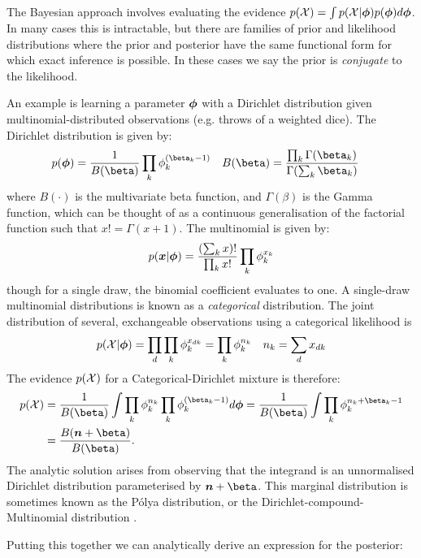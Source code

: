The Bayesian approach involves evaluating the evidence $p({ \mathcal{X} }) = \int p({ \mathcal{X} } | { \bm \phi }) p({ \bm \phi }) d{ \bm \phi }$. In many cases this is intractable, but there are families of prior and likelihood distributions where the prior and posterior have the same functional form for which exact inference is possible. In these cases we say the prior is \emph{conjugate} to the likelihood.

An example is learning a parameter ${ \bm \phi }$ with a Dirichlet distribution given multinomial-distributed observations (e.g. throws of a weighted dice). The Dirichlet distribution is given by:
\begin{align}
p(\param) & = \oneover{B(\vv{\beta})} \prod_k \phi_k^{(\beta_k - 1)} &
B(\vv{\beta}) & = \frac{\prod_k \Gamma(\beta_k)}{\Gamma(\sum_k \beta_k)}
\end{align}
where $B(\cdot)$ is the multivariate beta function, and $\Gamma(\beta)$ is the Gamma function, which can be thought of as a continuous generalisation of the factorial function such that $x! = \Gamma(x+1)$. The multinomial is given by:
\begin{align}
p(\bm x|{ \bm \phi }) = \frac{(\sum_k x)!}{\prod_k x!} \prod_k \phi_k^{x_k}
\end{align}
though for a single draw, the binomial coefficient evaluates to one. A single-draw multinomial distributions is known as a \emph{categorical} distribution. The joint distribution of several, exchangeable observations using a categorical likelihood is 
\begin{align}
p({ \mathcal{X} }|{ \bm \phi }) & = \prod_d \prod_k \phi_k^{x_{dk}} = \prod_k \phi_k^{n_k} &
n_k = \sum_d x_{dk}
\end{align}
The evidence $p({ \mathcal{X} })$ for a Categorical-Dirichlet mixture is therefore:
\begin{align}
p(\xdat) & = \frac{1}{B(\beta)} \int \prod_k \phi_k^{n_k} \prod_k \phi_k^{(\beta_k - 1)} d\param  = \frac{1}{B(\beta)} \int \prod_k \phi_k^{n_k + \beta_k - 1} \\
& = \frac{B(\vv{n} + \vv{\beta})}{B(\vv{\beta})}.
\end{align}
The analytic solution arises from observing that the integrand is an unnormalised Dirichlet distribution parameterised by $\vv{n} + \vv{\beta}$. This marginal distribution is sometimes known as the P\'{o}lya distribution, or the Dirichlet-compound-Multinomial distribution \cite{Madsen2005}.\label{polya}

Putting this together we can analytically derive an expression for the posterior:

